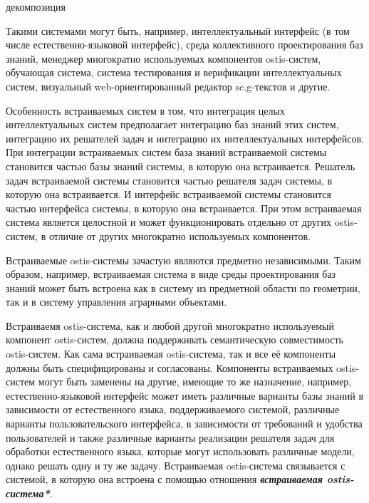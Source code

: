 \begin{SCn}
	\begin{scnrelfromset}{декомпозиция}
	\end{scnrelfromset}
\end{SCn}

Такими системами могут быть, например, интеллектуальный интерфейс (в том числе естественно-языковой интерфейс), среда коллективного проектирования баз знаний, менеджер многократно используемых компонентов ostis-систем, обучающая система, система тестирования и верификации интеллектуальных систем, визуальный web-ориентированный редактор sc.g-текстов и другие.

Особенность встраиваемых систем в том, что интеграция целых интеллектуальных систем предполагает интеграцию баз знаний этих систем, интеграцию их решателей задач и интеграцию их интеллектуальных интерфейсов. При интеграции встраиваемых систем база знаний встраиваемой системы становится частью базы знаний системы, в которую она встраивается. Решатель задач встраиваемой системы становится частью решателя задач системы, в которую она встраивается. И интерфейс встраиваемой системы становится частью интерфейса системы, в которую она встраивается. При этом встраиваемая система является целостной и может функционировать отдельно от других ostis-систем, в отличие от других многократно используемых компонентов.

Встраиваемые ostis-системы зачастую являются предметно независимыми. Таким образом, например, встраиваемая система в виде среды проектирования баз знаний может быть встроена как в систему из предметной области по геометрии, так и в систему управления аграрными объектами.

Встраиваемя ostis-система, как и любой другой многократно используемый компонент ostis-систем, должна поддерживать семантическую совместимость ostis-систем. Как сама встраиваемая ostis-система, так и все её компоненты должны быть специфицированы и согласованы. Компоненты встраиваемых ostis-систем могут быть заменены на другие, имеющие то же назначение, например, естественно-языковой интерфейс может иметь различные варианты базы знаний в зависимости от естественного языка, поддерживаемого системой, различные варианты пользовательского интерфейса, в зависимости от требований и удобства пользователей и также различные варианты реализации решателя задач для обработки естественного языка, которые могут использовать различные модели, однако решать одну и ту же задачу. Встраиваемая ostis-система связывается с системой, в которую она встроена с помощью отношения \textit{\textbf{встраиваемая ostis-система*}}.

